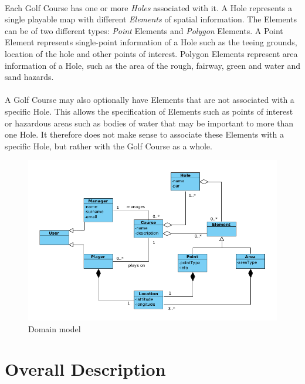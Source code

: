 \documentclass{article}
\begin{document}
    \paragraph{}
    Each Golf Course has one or more \textit{Holes} associated with it. A Hole
    represents a single playable map with different \textit{Elements} of spatial
    information. The Elements can be of two different types: \textit{Point}
    Elements and \textit{Polygon} Elements. A Point Element represents
    single-point information of a Hole such as the teeing grounds, location of
    the hole and other points of interest. Polygon Elements represent area
    information of a Hole, such as the area of the rough, fairway, green and
    water and sand hazards.

    \paragraph{}
    A Golf Course may also optionally have Elements that are not associated with
    a specific Hole. This allows the specification of Elements such as points of
    interest or hazardous areas such as bodies of water that may be important to
    more than one Hole. It therefore does not make sense to associate these
    Elements with a specific Hole, but rather with the Golf Course as a whole.
    
    \begin{figure}[h]
    	\centering
    	\includegraphics[scale=1]{DomainModel}
    	\caption{Domain model}
    	\label{domainmodel}
    \end{figure}
    
    

    \newpage

    \section{Overall Description} 
\end{document}
